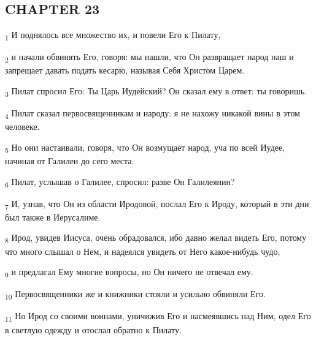 \subsection{CHAPTER 23}
\begin{tcolorbox}
\textsubscript{1} И поднялось все множество их, и повели Его к Пилату,
\end{tcolorbox}
\begin{tcolorbox}
\textsubscript{2} и начали обвинять Его, говоря: мы нашли, что Он развращает народ наш и запрещает давать подать кесарю, называя Себя Христом Царем.
\end{tcolorbox}
\begin{tcolorbox}
\textsubscript{3} Пилат спросил Его: Ты Царь Иудейский? Он сказал ему в ответ: ты говоришь.
\end{tcolorbox}
\begin{tcolorbox}
\textsubscript{4} Пилат сказал первосвященникам и народу: я не нахожу никакой вины в этом человеке.
\end{tcolorbox}
\begin{tcolorbox}
\textsubscript{5} Но они настаивали, говоря, что Он возмущает народ, уча по всей Иудее, начиная от Галилеи до сего места.
\end{tcolorbox}
\begin{tcolorbox}
\textsubscript{6} Пилат, услышав о Галилее, спросил: разве Он Галилеянин?
\end{tcolorbox}
\begin{tcolorbox}
\textsubscript{7} И, узнав, что Он из области Иродовой, послал Его к Ироду, который в эти дни был также в Иерусалиме.
\end{tcolorbox}
\begin{tcolorbox}
\textsubscript{8} Ирод, увидев Иисуса, очень обрадовался, ибо давно желал видеть Его, потому что много слышал о Нем, и надеялся увидеть от Него какое-нибудь чудо,
\end{tcolorbox}
\begin{tcolorbox}
\textsubscript{9} и предлагал Ему многие вопросы, но Он ничего не отвечал ему.
\end{tcolorbox}
\begin{tcolorbox}
\textsubscript{10} Первосвященники же и книжники стояли и усильно обвиняли Его.
\end{tcolorbox}
\begin{tcolorbox}
\textsubscript{11} Но Ирод со своими воинами, уничижив Его и насмеявшись над Ним, одел Его в светлую одежду и отослал обратно к Пилату.
\end{tcolorbox}
